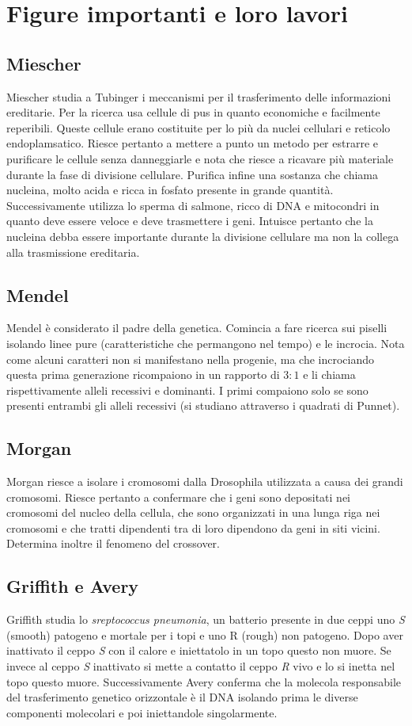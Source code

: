 \section{Figure importanti e loro lavori}
\subsection{Miescher}
Miescher studia a Tubinger i meccanismi per il trasferimento delle informazioni ereditarie. Per la ricerca usa cellule di pus in quanto economiche e facilmente reperibili. Queste cellule
erano costituite per lo pi\`u da nuclei cellulari e reticolo endoplamsatico. Riesce pertanto a mettere a punto un metodo per estrarre e purificare le cellule senza danneggiarle e nota 
che riesce a ricavare pi\`u materiale durante la fase di divisione cellulare. Purifica infine una sostanza che chiama nucleina, molto acida e ricca in fosfato presente in grande 
quantit\`a. Successivamente utilizza lo sperma di salmone, ricco di DNA e mitocondri in quanto deve essere veloce e deve trasmettere i geni. Intuisce pertanto che la nucleina debba 
essere importante durante la divisione cellulare ma non la collega alla trasmissione ereditaria. 
\subsection{Mendel}
Mendel \`e considerato il padre della genetica. Comincia a fare ricerca sui piselli isolando linee pure (caratteristiche che permangono nel tempo) e le incrocia. Nota come alcuni 
caratteri non si manifestano nella progenie, ma che incrociando questa prima generazione ricompaiono in un rapporto di $3:1$ e li chiama rispettivamente alleli recessivi e dominanti. 
I primi compaiono solo se sono presenti entrambi gli alleli recessivi (si studiano attraverso i quadrati di Punnet). 
\subsection{Morgan}
Morgan riesce a isolare i cromosomi dalla Drosophila utilizzata a causa dei grandi cromosomi. Riesce pertanto a confermare che i geni sono depositati nei cromosomi del nucleo della
cellula, che sono organizzati in una lunga riga nei cromosomi e che tratti dipendenti tra di loro dipendono da geni in siti vicini. Determina inoltre il fenomeno del crossover. 
\subsection{Griffith e Avery}
Griffith studia lo \emph{sreptococcus pneumonia}, un batterio presente in due ceppi uno \emph{S} (smooth) patogeno e mortale per i topi e uno R (rough) non patogeno. Dopo aver 
inattivato il ceppo \emph{S} con il calore e iniettatolo in un topo questo non muore. Se invece al ceppo \emph{S} inattivato si mette a contatto il ceppo \emph{R} vivo e lo si inetta nel
topo questo muore. Successivamente Avery conferma che la molecola responsabile del trasferimento genetico orizzontale \`e il DNA isolando prima le diverse componenti molecolari e poi 
iniettandole singolarmente. 
